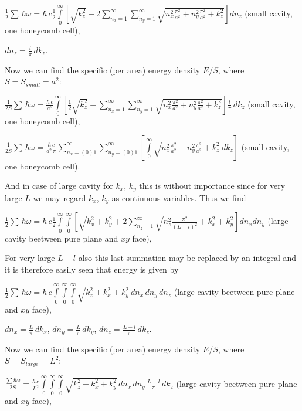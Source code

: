 \documentclass[11pt]{article}
\begin{document}
\(\frac{1}{2}\sum\,\hbar\omega = \hbar\,c\frac{1}{2}\int\limits_{0}^{\infty}\left[{\sqrt{k_z^2}+2\sum\limits_{n_x=1}^{\infty}\sum\limits_{n_y=1}^{\infty}\sqrt{n_x^2\frac{\pi^2}{a^2}+n_y^2\frac{\pi^2}{a^2}+k_z^2}}\right]d{n_z}\)
(small cavity, one honeycomb cell),

\(dn_z = \frac{l}{\pi}\,dk_z\).

    Now we can find the specific (per area) energy density \(E/S\), where
\(S = S_{small} = a^2\):

    \(\frac{1}{2 S}\sum\,\hbar\omega = \frac{\hbar\,c}{a^2}\int\limits_{0}^{\infty}\left[{\frac{1}{2}\sqrt{k_z^2}+\sum\limits_{n_x=1}^{\infty}\sum\limits_{n_y=1}^{\infty}\sqrt{n_x^2\frac{\pi^2}{a^2}+n_y^2\frac{\pi^2}{a^2}+k_z^2}}\right]\frac{l}{\pi}\,dk_z\)
(small cavity, one honeycomb cell),

    \(\frac{1}{2 S}\sum\,\hbar\omega = \frac{\hbar\,c}{a^2\,\pi}\sum\limits_{n_x=(0)1}^{\infty}\sum\limits_{n_y=(0)1}^{\infty}\left[\int\limits_{0}^{\infty}\sqrt{n_x^2\frac{\pi^2}{a^2}+n_y^2\frac{\pi^2}{a^2}+k_z^2}\,dk_z\right]\)
(small cavity, one honeycomb cell).

    And in case of large cavity for \(k_x\), \(k_y\) this is without
importance since for very large \(L\) we may regard \(k_x\), \(k_y\) as
continuous variables. Thus we find

\(\frac{1}{2}\sum\,\hbar\omega = \hbar\,c\frac{1}{2}\int\limits_{0}^{\infty}\int\limits_{0}^{\infty}\left[{\sqrt{k_x^2+k_y^2}+2\sum\limits_{n_z=1}^{\infty}\sqrt{n_z^2\frac{\pi^2}{(L-l)^2}+k_x^2+k_y^2}}\right]d{n_x}d{n_y}\)
(large cavity beetween pure plane and \(xy\) face),

For very large \(L-l\) also this last summation may be replaced by an
integral and it is therefore easily seen that energy is given by

\(\frac{1}{2}\sum\,\hbar\omega = \hbar\,c\int\limits_{0}^{\infty}\int\limits_{0}^{\infty}\int\limits_{0}^{\infty}\sqrt{k_z^2+k_x^2+k_y^2}\,d{n_x}\,d{n_y}\,d{n_z}\)
(large cavity beetween pure plane and \(xy\) face),

\(dn_x = \frac{L}{\pi}\,dk_x\), \(dn_y = \frac{L}{\pi}\,dk_y\),
\(dn_z = \frac{L-l}{\pi}\,dk_z\).

    Now we can find the specific (per area) energy density \(E/S\), where
\(S = S_{large} = L^2\):

\(\frac{\sum\hbar\omega}{2 S} = \frac{\hbar\,c}{L^2}\int\limits_{0}^{\infty}\int\limits_{0}^{\infty}\int\limits_{0}^{\infty}\sqrt{k_z^2+k_x^2+k_y^2}\,dn_x\,dn_y\,\frac{L-l}{\pi}\,dk_z\)
(large cavity beetween pure plane and \(xy\) face),
\end{document}
